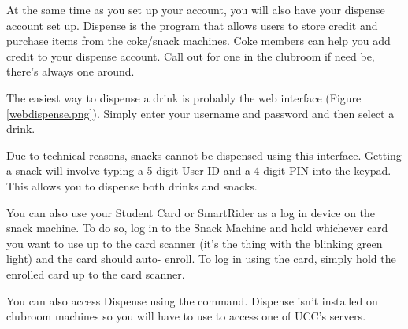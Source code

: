 

\begin{mdframed}
\null
At the same time as you set up your account, you will also have your dispense account set up. Dispense is the program that allows users to store credit and purchase items from the coke/snack machines. Coke members can help you add credit to your dispense account. Call out for one in the clubroom if need be, there's always one around.


The easiest way to dispense a drink is probably the web interface (Figure \ref{webdispense.png}). Simply enter your username and password and then select a drink. 

Due to technical reasons, snacks cannot be dispensed using this interface. Getting a snack will involve typing a 5 digit User ID and a 4 digit PIN into the keypad. This allows you to dispense both drinks and snacks.

You can also use your Student Card or SmartRider as a log in device on the snack machine. To do so, log in to the Snack Machine and hold whichever card you want to use up to the card scanner (it's the thing with the blinking green light) and the card should auto- enroll. To log in using the card, simply hold the enrolled card up to the card scanner.


You can also access Dispense using the  command. Dispense isn't installed on clubroom machines so you will have to use  to access one of UCC's servers.

\end{mdframed}

\pagebreak

